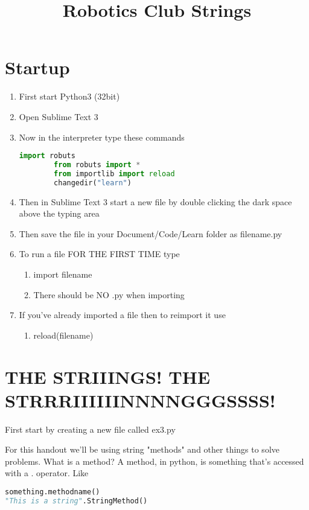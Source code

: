 \documentclass{article}
\title{Robotics Club Strings}
\begin{document}
\section{Startup}
\begin{enumerate}
	\item First start Python3 (32bit)
    \item Open Sublime Text 3
    \item Now in the interpreter type these commands
    \begin{lstlisting}[language=Python]
    	import robuts
        from robuts import *
        from importlib import reload
        changedir("learn")
   \end{lstlisting}

   \item Then in Sublime Text 3 start a new file by double clicking the dark space above the typing area
   \item Then save the file in your Document/Code/Learn folder as filename.py
   \item To run a file FOR THE FIRST TIME type
  \begin{enumerate}
      \item import filename
      \item There should be NO .py when importing
   \end{enumerate}
   \item If you've already imported a file then to reimport it use
   \begin{enumerate}
		\item reload(filename)
   \end{enumerate}
\end{enumerate}	

\section{THE STRIIINGS! THE STRRRIIIIIINNNNGGGSSSS!}
First start by creating a new file called ex3.py

For this handout we'll be using string "methods" and other things to solve problems. 
What is a method? A method, in python, is something that's accessed with a . operator. 
Like
\begin{lstlisting}[language=Python]
something.methodname()
"This is a string".StringMethod()
\end{lstlisting}
\end{document}
